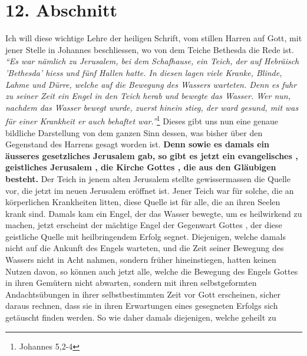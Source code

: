 \section{12. Abschnitt} \label{kap6_ab12}

\label{ref:06_12_wahre_kirche}
Ich will diese wichtige Lehre der heiligen Schrift, vom stillen Harren auf Gott,
mit jener Stelle in Johannes beschliessen, wo von dem Teiche Bethesda
die Rede ist.
\textit{"`Es war nämlich zu Jerusalem, bei dem Schafhause, ein Teich, der
auf Hebräisch 'Bethesda' hiess und fünf Hallen hatte. In diesen lagen viele
Kranke, Blinde, Lahme und Dürre, welche auf die Bewegung des Wassers warteten.
Denn es fuhr zu seiner Zeit ein Engel in den Teich herab und bewegte das
Wasser. Wer nun, nachdem das Wasser bewegt wurde, zuerst hinein stieg, der ward
gesund, mit was für einer Krankheit er auch behaftet war."'}\footnote{Johannes
5,2-4}
Dieses gibt uns nun eine genaue bildliche Darstellung von dem ganzen Sinn
dessen, was bisher über den Gegenstand des Harrens gesagt worden ist.
\textbf{Denn sowie
es damals ein äusseres gesetzliches Jerusalem
gab, so gibt es jetzt ein
evangelisches , geistliches Jerusalem
, die Kirche Gottes , die aus
den Gläubigen  
besteht.} Der Teich in jenem alten Jerusalem 
stellte gewissermassen die Quelle
vor, die jetzt im neuen Jerusalem  eröffnet ist.
Jener Teich war für solche, die
an körperlichen Krankheiten litten, diese Quelle ist für alle, die an ihren
Seelen krank sind. Damals kam ein Engel, der das Wasser bewegte, um es
heilwirkend zu machen, jetzt erscheint der mächtige Engel
 der
Gegenwart Gottes ,
der diese geistliche Quelle  mit heilbringendem Erfolg
segnet. Diejenigen,
welche damals nicht auf die Ankunft des Engels warteten, und die Zeit seiner
Bewegung des Wassers nicht in Acht nahmen, sondern früher hineinstiegen, hatten
keinen Nutzen davon, so können auch jetzt alle, welche die Bewegung des Engels
Gottes in ihren Gemütern nicht abwarten, sondern mit ihren selbstgeformten
Andachtsübungen in ihrer selbstbestimmten Zeit vor Gott erscheinen, sicher
daraus rechnen, dass sie in ihren Erwartungen eines gesegneten Erfolgs sich
getäuscht finden werden. So wie daher damals diejenigen, welche geheilt zu
